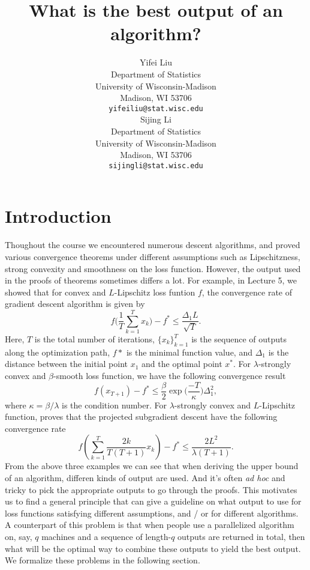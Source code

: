 \documentclass{article}
\title{What is the best output of an algorithm?}
\author{
  Yifei Liu \\ %
  Department of Statistics\\
  University of Wisconsin-Madison\\
  Madison, WI 53706 \\
  \texttt{yifeiliu@stat.wisc.edu} \\
 \And
 Sijing Li \\
 Department of Statistics \\
 University of Wisconsin-Madison\\
 Madison, WI 53706 \\
 \texttt{sijingli@stat.wisc.edu} \\
}
\begin{document}

\maketitle

\section{Introduction}
Thoughout the course we encountered numerous descent algorithms, and proved various convergence theorems under different assumptions such as Lipschitzness, strong convexity and smoothness on the loss function. However, the output used in the proofs of theorems sometimes differs a lot. For example, in Lecture 5, we showed that for convex and $L$-Lipschitz loss funtion $f$, the convergence rate of gradient descent algorithm is given by
\begin{equation}
  \label{eq:lipschtz}
  f\bigg(\frac{1}{T}\sum_{k=1}^T x_k\bigg) - f^* \leq \frac{\Delta_1 L}{\sqrt{T}}.
\end{equation}
Here, $T$ is the total number of iterations, $\{x_k\}_{k=1}^T$ is the sequence of outputs along the optimization path, $f*$ is the minimal function value, and $\Delta_1$ is the distance between the initial point $x_1$ and the optimal point $x^*$. For $\lambda$-strongly convex and $\beta$-smooth loss function, we have the following convergence result
\begin{equation}
  \label{eq:strcvx_smooth}
  f(x_{T+1}) - f^* \leq \frac{\beta}{2}\exp\bigg(\frac{-T}{\kappa}\bigg)\Delta_1^2,
\end{equation}
where $\kappa = \beta / \lambda$ is the condition number. For $\lambda$-strongly convex and $L$-Lipschitz function, \cite{bubeck2014convex} proves that the projected subgradient descent have the following convergence rate
\begin{equation}
  \label{eq:strcvx_lipschitz}
  f(\sum_{k=1}^T \frac{2k}{T(T+1)} x_k) - f^* \leq \frac{2 L^2}{\lambda (T+1)}.
\end{equation}
From the above three examples we can see that when deriving the upper bound of an algorithm, differen kinds of output are used. And it's often \textit{ad hoc} and tricky to pick the appropriate outputs to go through the proofs. This motivates us to find a general principle that can give a guideline on what output to use for loss functions satisfying different assumptions, and / or for different algorithms. A counterpart of this problem is that when people use a parallelized algorithm on, say, $q$ machines and a sequence of length-$q$ outputs are returned in total, then what will be the optimal way to combine these outputs to yield the best output. We formalize these problems in the following section.
\end{document}
